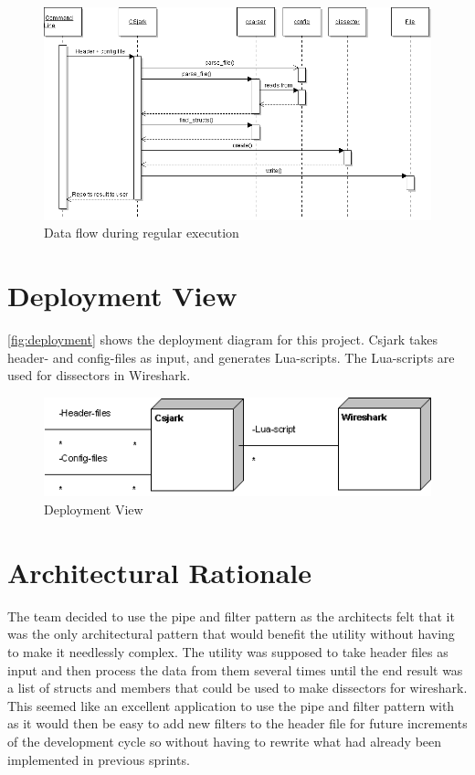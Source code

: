 \begin{figure}[htb]
	\includegraphics[width=\textwidth]{./planning/img/SequenceDiagram}
	\caption{Data flow during regular execution\label{fig:processview}}
\end{figure}


\section{Deployment View}
\autoref{fig:deployment} shows the deployment diagram for this project. Csjark takes header- and config-files as input, and generates Lua-scripts. The Lua-scripts are used for dissectors in Wireshark.

\begin{figure}[htb]
	\includegraphics[width = \textwidth]{./planning/img/Deployment}
	\caption{Deployment View\label{fig:deployment}}
\end{figure}


\section{Architectural Rationale}
The team decided to use the pipe and filter pattern as the architects felt that it was the only architectural pattern that would benefit the utility without having to make it needlessly complex. The utility was supposed to take header files as input and then process the data from them several times until the end result was a list of structs and members that could be used to make dissectors for wireshark. This seemed like an excellent application to use the pipe and filter pattern with as it would then be easy to add new filters to the header file for future increments of the development cycle so without having to rewrite what had already been implemented in previous sprints.

